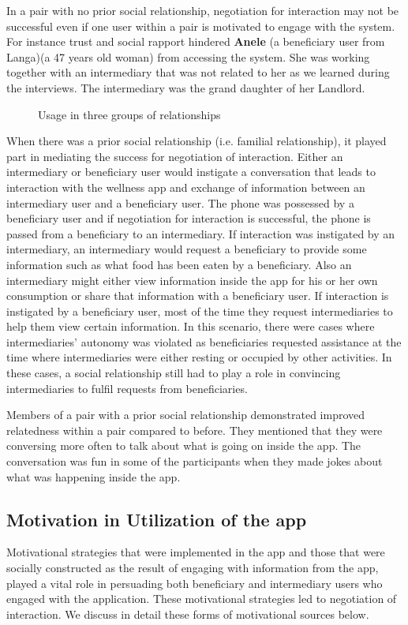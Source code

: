 \documentclass{sig-alternate}
\begin{document}
In a pair with no prior social relationship, negotiation for interaction may
not be successful even if one user within a pair is motivated to engage with
the system. For instance trust and social rapport hindered \textbf{Anele} (a
beneficiary user from Langa)(a 47 years old woman) from accessing the system.
She was working together with an intermediary that was not related to her as
we learned  during the interviews. The intermediary was the grand daughter of
her Landlord.

 \begin{figure}
\centering
{}
\caption{Usage in three groups of relationships}
\label{figure:relation}
\end{figure}

When there was a prior social relationship (i.e. familial relationship), it
played part in mediating the success for negotiation of interaction. Either an
intermediary or beneficiary user would instigate a conversation that leads to
interaction with the wellness app and exchange of information between an
intermediary user and a beneficiary user. The phone was possessed by a
beneficiary user and if negotiation for interaction is successful, the phone
is passed from a beneficiary to an intermediary. If interaction was instigated
by an intermediary, an intermediary would request a beneficiary to provide
some information such as what food has been eaten by a beneficiary. Also an
intermediary might either view information inside the app for his or her own
consumption or share that information with a beneficiary user. If interaction
is instigated by a beneficiary user, most of the time they request
intermediaries to help them view certain information. In this scenario, there
were cases where intermediaries' autonomy was violated as beneficiaries
requested assistance at the time where intermediaries were either resting or
occupied by other activities. In these cases, a social relationship still had
to play a role in convincing intermediaries to fulfil requests from
beneficiaries.

Members of a pair with a prior social relationship demonstrated improved
relatedness within a pair compared to before. They mentioned that they were
conversing more often to talk about what is going on inside the app. The
conversation was fun in some of the participants when they made jokes about
what was happening inside the app.
\subsection{Motivation in Utilization of the app}
Motivational strategies that were implemented in the app and those that were
socially constructed as the result of engaging with information from the app,
played a vital role in persuading both beneficiary and intermediary users who
engaged with the application. These motivational strategies led to negotiation
of interaction. We discuss in detail these forms of motivational sources
below.
\end{document}
